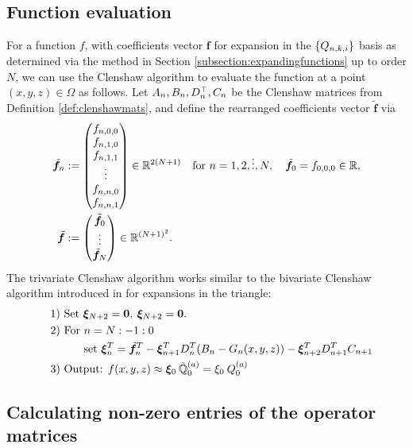 \documentclass[11pt, oneside]{article}   	%
\begin{document}
\subsection{Function evaluation}\label{subsection:functionevaluation}

For a function $f$, with coefficients vector $\bm{f}$ for expansion in the $\{Q_{n,k,i}\}$ basis as determined via the method in Section \ref{subsection:expandingfunctions} up to order $N$, we can use the Clenshaw algorithm to evaluate the function at a point $(x,y,z) \in \Omega$ as follows. Let $A_n, B_n, D^\top_n, C_n$ be the Clenshaw matrices from Definition \ref{def:clenshawmats}, and define the rearranged coefficients vector $\tilde{\bm{f}}$ via
\begin{align*}
	\tilde{\bm{f}}_n &:= 
		\begin{pmatrix}
			f_{n,0,0} \\
			f_{n,1,0} \\
			f_{n,1,1} \\
			\vdots \\
			f_{n,n,0} \\
			f_{n,n,1}
		\end{pmatrix} \in \mathbb{R}^{2(N+1)} \quad \text{for } n = 1,2,\vdots,N, \quad
	\tilde{\bm{f}}_0 = f_{0,0,0} \in \mathbb{R}, \\
	\tilde{\bm{f}} &:= 
		\begin{pmatrix}
			\tilde{\bm{f}}_0 \\
			\vdots \\
			\tilde{\bm{f}}_N
		\end{pmatrix} \in \mathbb{R}^{(N+1)^2}.
\end{align*}
The trivariate Clenshaw algorithm works similar to the bivariate Clenshaw algorithm introduced in \cite{olver2019triangle} for expansions in the triangle:
\begin{align*}
	\quad &\text{1) } \text{Set } \bm{\xi}_{N+2} = \bold{0}, \: \bm{\xi}_{N+2} = \bold{0}. \\
	\quad &\text{2) } \text{For } n = N:-1:0 \\
	\quad & \quad \quad \quad \text{set } \bm{\xi}_{n}^T = {\tilde{\bm{f}}_n}^T - \bm{\xi}_{n+1}^T D^T_n (B_n - G_n(x,y,z)) -  \bm{\xi}_{n+2}^T D^T_{n+1}C_{n+1} \\
	\quad &\text{3) } \text{Output: } f(x,y,z) \approx \bm{\xi}_{0} \: \mathbb{\tilde{Q}}^{(a)}_{0}  = \xi_{0} \: Q^{(a)}_0
\end{align*}


\subsection{Calculating non-zero entries of the operator matrices}\label{subsection:Computation-operatormatrices}
\end{document}
